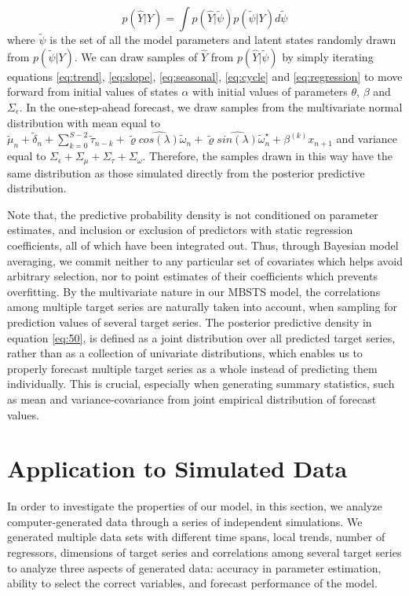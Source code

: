 \documentclass[twoside,11pt]{article}
\begin{document}
\begin{equation} \label{eq:50}
p(\hat{Y}|Y)=\int p(\hat{Y}|\tilde{\psi})p(\tilde{\psi}|Y)d\tilde{\psi}
\end{equation}
where $\tilde{\psi}$ is the set of all the model parameters and latent states randomly drawn from $p(\tilde{\psi}|Y)$. We can draw samples of $\hat{Y}$ from $p(\hat{Y}|\tilde{\psi})$ by simply iterating equations \eqref{eq:trend}, \eqref{eq:slope}, \eqref{eq:seasonal}, \eqref{eq:cycle} and \eqref{eq:regression} to move forward from initial values of states $\alpha$ with initial values of parameters $\theta$, $\beta$ and $\Sigma_\epsilon$.
In the one-step-ahead forecast, we draw samples from the multivariate normal distribution with mean equal to $\tilde{\mu}_n+\tilde{\delta}_n+\sum_{k=0}^{S-2}\tilde{\tau}_{n-k}+\tilde{\varrho}\widehat{cos(\lambda)}\tilde{\omega}_{n}+\tilde{\varrho} \widehat{sin(\lambda)}\tilde{\omega}_{n}^\star+\beta^{(k)}x_{n+1}$ and variance equal to $\Sigma_\epsilon+\Sigma_{\mu}+\Sigma_{\tau}+\Sigma_\omega.$
Therefore, the samples drawn in this way have the same distribution as those simulated directly from the posterior predictive distribution.

Note that, the predictive probability density is not conditioned on parameter estimates, and inclusion or exclusion of predictors with static regression coefficients, all of which have been integrated out. Thus, through Bayesian model averaging, we commit neither to any particular set of covariates which helps avoid arbitrary selection, nor to point estimates of their coefficients which prevents overfitting. By the multivariate nature in our MBSTS model, the correlations among multiple target series are naturally taken into account, when sampling for prediction values of several target series.
The posterior predictive density in equation \eqref{eq:50}, is defined as a joint distribution over all predicted target series, rather than as a collection of univariate distributions, which enables us to properly forecast multiple target series as a whole instead of predicting them individually. This is crucial, especially when generating summary statistics, such as mean and variance-covariance from joint empirical distribution of forecast values.


\section{Application to Simulated Data}
In order to investigate the properties of our model, in this section, we analyze computer-generated data through a series of independent simulations. We generated multiple data sets with different time spans, local trends, number of regressors, dimensions of target series and correlations among several target series to analyze three aspects of generated data: accuracy in parameter estimation, ability to select the correct variables, and forecast performance of the model.
\end{document}
